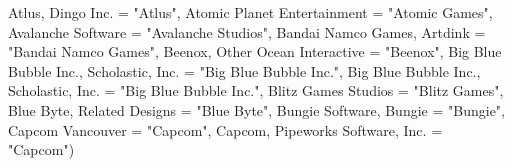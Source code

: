 \documentclass[
]{article}
\newenvironment{Shaded}{\begin{snugshade}}{\end{snugshade}}
\newcommand{\AttributeTok}[1]{\textcolor[rgb]{0.77,0.63,0.00}{#1}}
\newcommand{\NormalTok}[1]{#1}
\newcommand{\OtherTok}[1]{\textcolor[rgb]{0.56,0.35,0.01}{#1}}
\newcommand{\StringTok}[1]{\textcolor[rgb]{0.31,0.60,0.02}{#1}}
\begin{document}
\begin{Shaded}
\begin{Highlighting}[]
    \StringTok{\textasciigrave{}}\AttributeTok{Atlus, Dingo Inc.}\StringTok{\textasciigrave{}} \OtherTok{=} \StringTok{"Atlus"}\NormalTok{, }\StringTok{\textasciigrave{}}\AttributeTok{Atomic Planet Entertainment}\StringTok{\textasciigrave{}} \OtherTok{=} \StringTok{"Atomic Games"}\NormalTok{,}
    \StringTok{\textasciigrave{}}\AttributeTok{Avalanche Software}\StringTok{\textasciigrave{}} \OtherTok{=} \StringTok{"Avalanche Studios"}\NormalTok{, }\StringTok{\textasciigrave{}}\AttributeTok{Bandai Namco Games, Artdink}\StringTok{\textasciigrave{}} \OtherTok{=} \StringTok{"Bandai Namco Games"}\NormalTok{,}
    \StringTok{\textasciigrave{}}\AttributeTok{Beenox, Other Ocean Interactive}\StringTok{\textasciigrave{}} \OtherTok{=} \StringTok{"Beenox"}\NormalTok{, }\StringTok{\textasciigrave{}}\AttributeTok{Big Blue Bubble Inc., Scholastic, Inc.}\StringTok{\textasciigrave{}} \OtherTok{=} \StringTok{"Big Blue Bubble Inc."}\NormalTok{,}
    \StringTok{\textasciigrave{}}\AttributeTok{Big Blue Bubble Inc., Scholastic, Inc.}\StringTok{\textasciigrave{}} \OtherTok{=} \StringTok{"Big Blue Bubble Inc."}\NormalTok{, }\StringTok{\textasciigrave{}}\AttributeTok{Blitz Games Studios}\StringTok{\textasciigrave{}} \OtherTok{=} \StringTok{"Blitz Games"}\NormalTok{,}
    \StringTok{\textasciigrave{}}\AttributeTok{Blue Byte, Related Designs}\StringTok{\textasciigrave{}} \OtherTok{=} \StringTok{"Blue Byte"}\NormalTok{, }\StringTok{\textasciigrave{}}\AttributeTok{Bungie Software, Bungie}\StringTok{\textasciigrave{}} \OtherTok{=} \StringTok{"Bungie"}\NormalTok{,}
    \StringTok{\textasciigrave{}}\AttributeTok{Capcom Vancouver}\StringTok{\textasciigrave{}} \OtherTok{=} \StringTok{"Capcom"}\NormalTok{, }\StringTok{\textasciigrave{}}\AttributeTok{Capcom, Pipeworks Software, Inc.}\StringTok{\textasciigrave{}} \OtherTok{=} \StringTok{"Capcom"}\NormalTok{)}


\end{Highlighting}
\end{Shaded}
\end{document}
